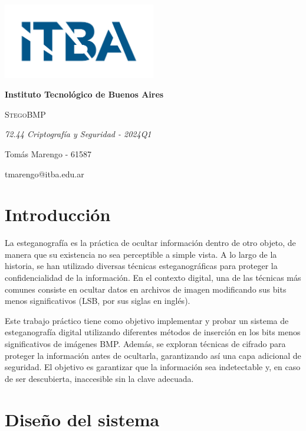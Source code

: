 \documentclass[a4paper,12pt]{article}
\begin{document}
	
	\begin{titlepage}
		\centering
		{\includegraphics[width=0.50\textwidth]{LogoITBA}\par}
		{\bfseries\LARGE Instituto Tecnol\'ogico de Buenos Aires \par}
		\vspace{2cm}
		{\scshape\Huge StegoBMP \par}
		\vspace{1cm}
		{\itshape\Large 72.44 Criptografía y Seguridad - 2024Q1 \par}
		\vspace{3cm}
		{\Large Tom\'as Marengo - 61587 \par}
		{\Large tmarengo@itba.edu.ar \par}	
		\vfill
	\end{titlepage}
	
	\newpage
	\tableofcontents
	\newpage
	
	\section{Introducción}
	La esteganografía es la práctica de ocultar información dentro de otro objeto, de manera que su existencia no sea perceptible a simple vista. A lo largo de la historia, se han utilizado diversas técnicas esteganográficas para proteger la confidencialidad de la información. En el contexto digital, una de las técnicas más comunes consiste en ocultar datos en archivos de imagen modificando sus bits menos significativos (LSB, por sus siglas en inglés).
	
	Este trabajo práctico tiene como objetivo implementar y probar un sistema de esteganografía digital utilizando diferentes métodos de inserción en los bits menos significativos de imágenes BMP. Además, se exploran técnicas de cifrado para proteger la información antes de ocultarla, garantizando así una capa adicional de seguridad. El objetivo es garantizar que la información sea indetectable y, en caso de ser descubierta, inaccesible sin la clave adecuada.

	\section{Diseño del sistema}
	
\end{document}

